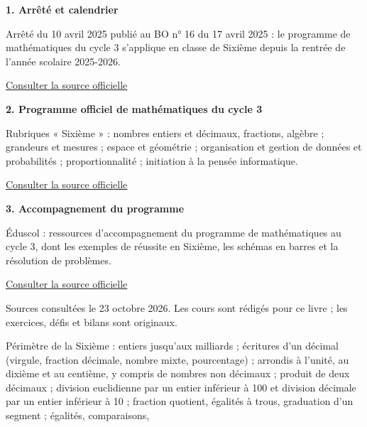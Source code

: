 \clearpage\thispagestyle{otFront}\label{references}\fontsize{11}{15}\selectfont
\par\medskip\textbf{1. Arrêté et calendrier}\par Arrêté du 10 avril 2025 publié au BO n° 16 du 17 avril 2025 : le programme de mathématiques du cycle 3 s’applique en classe de Sixième depuis la rentrée de l’année scolaire 2025-2026.\par\href{https://www.education.gouv.fr/bo/2025/Hebdo16/MENE2504620A}{\textcolor{otGreenDark}{Consulter la source officielle}}\par
\par\medskip\textbf{2. Programme officiel de mathématiques du cycle 3}\par Rubriques « Sixième » : nombres entiers et décimaux, fractions, algèbre ; grandeurs et mesures ; espace et géométrie ; organisation et gestion de données et probabilités ; proportionnalité ; initiation à la pensée informatique.\par\href{https://www.education.gouv.fr/sites/default/files/programme-de-math-matiques-pour-le-cycle-3-439827.pdf}{\textcolor{otGreenDark}{Consulter la source officielle}}\par
\par\medskip\textbf{3. Accompagnement du programme}\par Éduscol : ressources d’accompagnement du programme de mathématiques au cycle 3, dont les exemples de réussite en Sixième, les schémas en barres et la résolution de problèmes.\par\href{https://eduscol.education.gouv.fr/5712/ressources-d-accompagnement-du-programme-de-mathematiques-au-cycle-3}{\textcolor{otGreenDark}{Consulter la source officielle}}\par
\par\bigskip Sources consultées le 23 octobre 2026.
Les cours sont rédigés pour ce livre ; les exercices, défis et bilans
sont originaux.\par\medskip
Périmètre de la Sixième : entiers jusqu’aux milliards ; écritures d’un
décimal (virgule, fraction décimale, nombre mixte, pourcentage) ; arrondis
à l’unité, au dixième et au centième, y compris de nombres non décimaux ;
produit de deux décimaux ; division euclidienne par un entier inférieur à
100 et division décimale par un entier inférieur à 10 ; fraction quotient,
égalités à trous, graduation d’un segment ; égalités, comparaisons,
